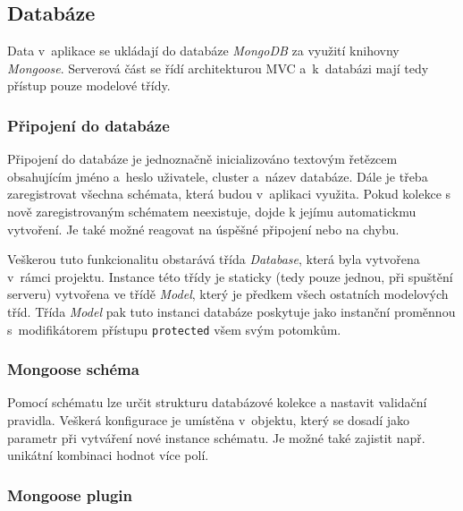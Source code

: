 \documentclass[a4paper,12pt]{article}
\def\code#1{\texttt{#1}}
\begin{document}
\subsection{Databáze}

Data v~aplikace se ukládají do databáze \textit{MongoDB} za využití knihovny \textit{Mongoose}. Serverová část se řídí architekturou MVC a~k~databázi mají tedy přístup pouze modelové třídy.

\subsubsection{Připojení do databáze}

Připojení do databáze je jednoznačně inicializováno textovým řetězcem obsahujícím jméno a~heslo uživatele, cluster a~název databáze. Dále je třeba zaregistrovat všechna schémata, která budou v~aplikaci využita. Pokud kolekce s nově zaregistrovaným schématem neexistuje, dojde k jejímu automatickmu vytvoření. Je také možné reagovat na úspěšné připojení nebo na chybu.

Veškerou tuto funkcionalitu obstarává třída \textit{Database}, která byla vytvořena v~rámci projektu. Instance této třídy je staticky (tedy pouze jednou, při spuštění serveru) vytvořena ve třídě \textit{Model}, který je předkem všech ostatních modelových tříd. Třída \textit{Model} pak tuto instanci databáze poskytuje jako instanční proměnnou s~modifikátorem přístupu \code{protected} všem svým potomkům.



\subsubsection{Mongoose schéma}

Pomocí schématu lze určit strukturu databázové kolekce a nastavit validační pravidla. Veškerá konfigurace je umístěna v~objektu, který se dosadí jako parametr při vytváření nové instance schématu. Je možné také zajistit např. unikátní kombinaci hodnot více polí.



\subsubsection{Mongoose plugin}
\end{document}
